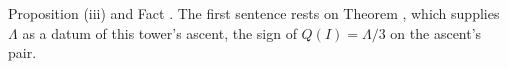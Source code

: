 Proposition (iii) and Fact . The first sentence rests on Theorem , which supplies $\Lambda$ as a datum of this tower's ascent, the sign of $Q(I) = \Lambda/3$ on the ascent's pair.

